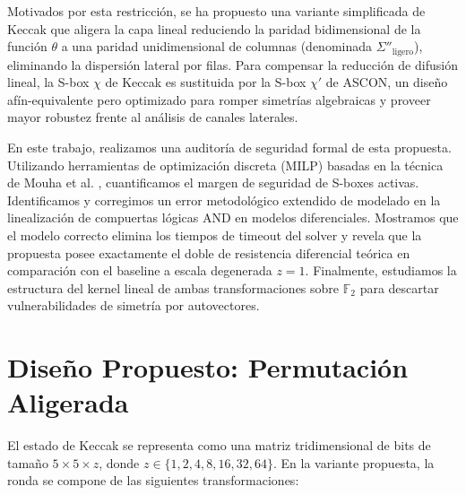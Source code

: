\documentclass[journal,compsoc]{IEEEtran}
\begin{document}
Motivados por esta restricción, se ha propuesto una variante simplificada de Keccak que aligera la capa lineal reduciendo la paridad bidimensional de la función $\theta$ a una paridad unidimensional de columnas (denominada $\Sigma''_{\text{ligero}}$), eliminando la dispersión lateral por filas. Para compensar la reducción de difusión lineal, la S-box $\chi$ de Keccak es sustituida por la S-box $\chi'$ de ASCON, un diseño afín-equivalente pero optimizado para romper simetrías algebraicas y proveer mayor robustez frente al análisis de canales laterales.

En este trabajo, realizamos una auditoría de seguridad formal de esta propuesta. Utilizando herramientas de optimización discreta (MILP) basadas en la técnica de Mouha et al. \cite{mouha}, cuantificamos el margen de seguridad de S-boxes activas. Identificamos y corregimos un error metodológico extendido de modelado en la linealización de compuertas lógicas AND en modelos diferenciales. Mostramos que el modelo correcto elimina los tiempos de timeout del solver y revela que la propuesta posee exactamente el doble de resistencia diferencial teórica en comparación con el baseline a escala degenerada $z=1$. Finalmente, estudiamos la estructura del kernel lineal de ambas transformaciones sobre $\mathbb{F}_2$ para descartar vulnerabilidades de simetría por autovectores.

\section{Diseño Propuesto: Permutación Aligerada}

El estado de Keccak se representa como una matriz tridimensional de bits de tamaño $5 \times 5 \times z$, donde $z \in \{1, 2, 4, 8, 16, 32, 64\}$. En la variante propuesta, la ronda se compone de las siguientes transformaciones:
\end{document}
